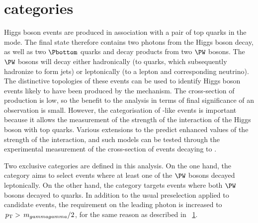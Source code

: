 \section{\TTHTag categories}
\label{cat:sec:tthtag}

Higgs boson events are produced in association with a pair of top quarks in the \ttH mode. The final state therefore contains two photons from the Higgs boson decay, as well as two $\Pbottom$ quarks and decay products from two $\PW$ bosons. The $\PW$ bosons will decay either hadronically (to quarks, which subsequently hadronize to form jets) or leptonically (to a lepton and corresponding neutrino). The distinctive topologies of these events can be used to identify Higgs boson events likely to have been produced by the \ttH mechanism. The cross-section of \ttH production is low, so the benefit to the analysis in terms of final significance of an observation is small. However, the categorisation of \ttH-like events is important because it allows the measurement of the strength of the interaction of the Higgs boson with top quarks. Various extensions to the \SM predict enhanced values of the strength of the \ttH interaction, and such models can be tested through the experimental measurement of the cross-section of \ttH events decaying to \Hgg.

Two exclusive \TTHTag categories are defined in this analysis. On the one hand, the \TTHLeptonicTag category aims to select \ttH events where at least one of the $\PW$ bosons decayed leptonically. On the other hand, the \TTHHadronicTag category targets events where both $\PW$ bosons decayed to quarks. In addition to the usual preselection applied to candidate events, the requirement on the leading photon \pT is increased to $\,p_\text{T}>\,m_{gammagamma}/2$, for the same reason as described in \Sec~\ref{cat:sec:tthtag}. %

